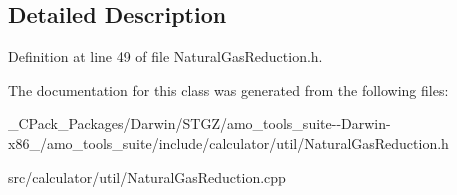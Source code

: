 \subsection{Detailed Description}


Definition at line 49 of file Natural\+Gas\+Reduction.\+h.



The documentation for this class was generated from the following files\+:\begin{DoxyCompactItemize}
\item 
\+\_\+\+C\+Pack\+\_\+\+Packages/\+Darwin/\+S\+T\+G\+Z/amo\+\_\+tools\+\_\+suite-\/-\/\+Darwin-\/x86\+\_/amo\+\_\+tools\+\_\+suite/include/calculator/util/Natural\+Gas\+Reduction.\+h\item 
src/calculator/util/Natural\+Gas\+Reduction.\+cpp\end{DoxyCompactItemize}
